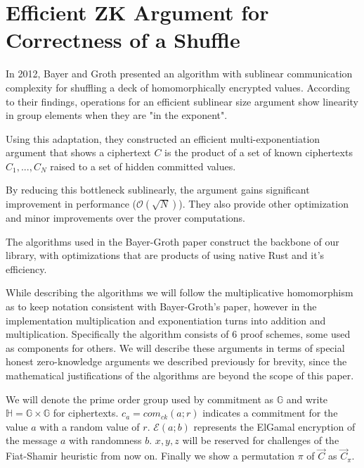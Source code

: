 \documentclass[12pt,a4paper]{report}
\begin{document}
\section{Efficient ZK Argument for Correctness of a Shuffle}
In 2012, Bayer and Groth\cite{bgshuffle} presented an algorithm with sublinear 
communication complexity for shuffling a deck of homomorphically encrypted values.
According to their findings, operations for an efficient sublinear size argument
show linearity in group elements when they are "in the exponent". \par
Using this adaptation, they constructed an efficient multi-exponentiation argument that shows a ciphertext
$C$ is the product of a set of known ciphertexts $C_1,...,C_N$ raised to a set of
hidden committed values. \par 
By reducing this bottleneck sublinearly, the argument 
gains significant improvement in performance ($\mathcal{O}(\sqrt{N})$).
They also provide other optimization and minor improvements over the prover computations.\par
The algorithms used in the Bayer-Groth paper construct the backbone of our library,
with optimizations that are products of using native Rust and it's efficiency.\par
While describing the algorithms we will follow the multiplicative homomorphism as to keep notation consistent with Bayer-Groth's paper, 
however in the implementation multiplication and exponentiation turns into addition and multiplication.
Specifically the algorithm consists of 6 proof schemes, some used as components for others.
We will describe these arguments in terms of special honest zero-knowledge arguments we described previously for brevity, 
since the mathematical justifications of the algorithms are beyond the scope of this paper.\par
We will denote the prime order group used by commitment as $\mathbb{G}$ and write $\mathbb{H} = \mathbb{G} \times \mathbb{G}$ for ciphertexts.
$c_a = com_{ck}(a; r)$ indicates a commitment for the value $a$ with a random value of $r$.
$\mathcal{E}(a; b)$ represents the ElGamal encryption of the message $a$ with randomness $b$.
$x, y, z$ will be reserved for challenges of the Fiat-Shamir heuristic from now on.
Finally we show a permutation $\pi$ of $\vec{C}$ as $\vec{C}_\pi$.
\end{document}
